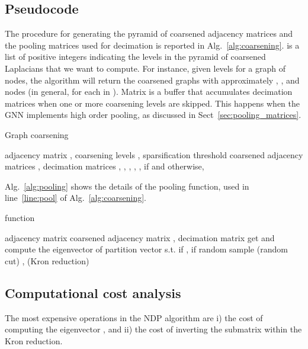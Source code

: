 \documentclass[journal]{IEEEtran}
\begin{document}
\subsection{Pseudocode}
\label{sec:pseudocode}

The procedure for generating the pyramid of coarsened adjacency matrices and the pooling matrices used for decimation is reported in Alg.~\ref{alg:coarsening}.
 is a list of positive integers indicating the levels in the pyramid of coarsened Laplacians that we want to compute. For instance, given levels  for a graph of  nodes, the algorithm will return the coarsened graphs with approximately , , and  nodes (in general,  for each  in ). 
Matrix  is a buffer that accumulates decimation matrices when one or more coarsening levels are skipped. 
This happens when the GNN implements high order pooling, as discussed in Sect~\ref{sec:pooling_matrices}.

\begin{algorithm}\footnotesize
\caption{Graph coarsening}
\label{alg:coarsening}
\begin{algorithmic}[1]
\REQUIRE adjacency matrix , coarsening levels , sparsification threshold 
\ENSURE coarsened adjacency matrices , decimation matrices 
\STATE , , , , 
\WHILE{}
\STATE  \label{line:pool}
\IF{}
\STATE , 
\STATE 
\ELSE
\STATE 
\ENDIF
\STATE 
\ENDWHILE
\STATE  if  and  otherwise,  
\end{algorithmic}
\end{algorithm}


Alg.~\ref{alg:pooling} shows the details of the pooling function, used in line~\ref{line:pool} of Alg.~\ref{alg:coarsening}.

\begin{algorithm}\footnotesize
\caption{ function}
\label{alg:pooling}
\begin{algorithmic}[1]
\REQUIRE adjacency matrix 
\ENSURE coarsened adjacency matrix , decimation matrix 
\STATE get   and  
\STATE compute the eigenvector  of 
\STATE partition vector  s.t.  if ,   if 
\IF{}
\STATE random sample  (random cut)
\ENDIF
\STATE , 
\STATE  (Kron reduction)
\STATE 
\STATE 
\end{algorithmic}
\end{algorithm}


\subsection{Computational cost analysis}
The most expensive operations in the NDP algorithm are i) the cost of computing the eigenvector , and ii) the cost of inverting the submatrix  within the Kron reduction.
\end{document}

